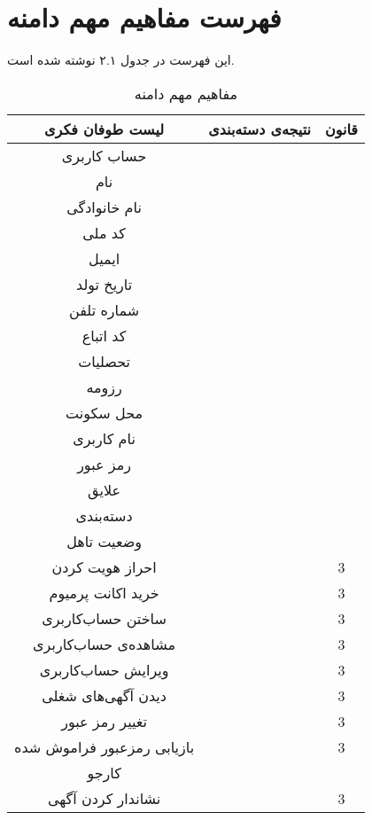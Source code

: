 \section{فهرست مفاهیم مهم دامنه}
این فهرست در جدول ۲.۱ نوشته شده است.

\begin{longtable}{|c|c|c|}
	\caption{مفاهیم مهم دامنه}\\
	\hline		لیست طوفان فکری &		نتیجه‌ی دسته‌بندی &		قانون \\
	\hline
	\hline		حساب کاربری &
	\myc &
	\onealef \\
	\hline		نام &
	\mya &
	\oneh \\
	\hline		نام خانوادگی &
	\mya &
	\oneh \\
	\hline		کد ملی &
	\mya &
	\oneh \\
	\hline		ایمیل &
	\mya &
	\oneh \\
	\hline		تاریخ تولد &
	\mya &
	\oneh \\
	\hline		شماره تلفن &
	\mya &
	\oneh \\
	\hline		کد اتباع &
	\mya &
	\oneh \\
	\hline		تحصلیات &
	\myc &
	\onej \\
	\hline		رزومه &
	\mya &
	\oneh \\
	\hline		محل سکونت &
	\mya &
	\oneh \\
	\hline		نام کاربری &
	\mya &
	\oneh \\
	\hline		رمز عبور &
	\mya &
	\oneh \\
	\hline		علایق &
	\myc &
	\onej \\
	\hline		دسته‌بندی&
	\myc &
	\onej \\
	\hline		وضعیت تاهل &
	\mya &
	\oneh \\
	\hline		احراز هویت کردن &
	\asus &
	3 \\
	\hline		خرید اکانت پرمیوم &
	\asus &
	3 \\
	\hline		ساختن حساب‌کاربری &
	\asus &
	3 \\
	\hline		مشاهده‌ی حساب‌کاربری &
	\asus &
	3 \\
	\hline		ویرایش حساب‌‌کاربری &
	\asus &
	3 \\
	\hline		دیدن آگهی‌های شغلی &
	\asus &
	3 \\
	\hline		تغییر رمز عبور &
	\asus &
	3 \\
	\hline		بازیابی رمزعبور فراموش شده &
	\asus &
	3 \\
	\hline		کارجو &
	\myc &
	\oned \\
	\hline
	نشاندار کردن آگهی		&
	\asjs &
	3 \\

\end{longtable}
